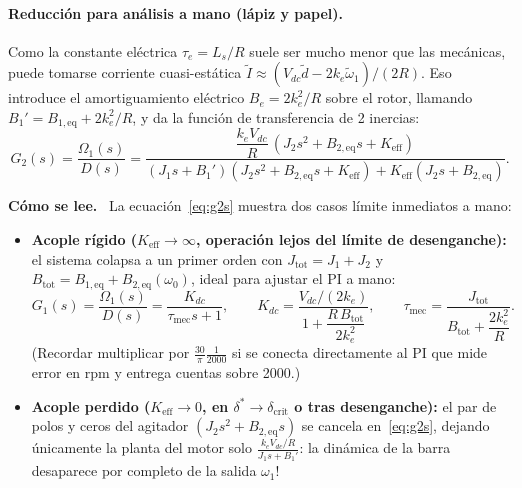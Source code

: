 \documentclass[11pt,a4paper,oneside]{report}
\theoremstyle{definition}
\theoremstyle{remark}
\newenvironment{lectura}%
  {\par\smallskip\noindent\textbf{Cómo se lee.}\ }%
  {\par\smallskip}
\begin{document}
\paragraph{Reducción para análisis a mano (lápiz y papel).} Como la constante
eléctrica $\tau_e = L_s/R$ suele ser mucho menor que las mecánicas, puede
tomarse corriente cuasi-estática $\tilde I \approx (V_{dc}\tilde d - 2k_e\tilde\omega_1)/(2R)$.
Eso introduce el amortiguamiento eléctrico $B_e = 2k_e^2/R$ sobre el rotor,
llamando $B_1' = B_{1,\text{eq}} + 2k_e^2/R$, y da la función de transferencia
de 2 inercias:
\begin{equation}
  G_2(s) = \frac{\Omega_1(s)}{D(s)}
  = \frac{\dfrac{k_e V_{dc}}{R}\,(J_2 s^2 + B_{2,\text{eq}} s + K_{\text{eff}})}
         {(J_1 s + B_1')(J_2 s^2 + B_{2,\text{eq}} s + K_{\text{eff}}) + K_{\text{eff}}(J_2 s + B_{2,\text{eq}})}.
  \label{eq:g2s}
\end{equation}
\begin{lectura}
La ecuación~\eqref{eq:g2s} muestra dos casos límite inmediatos a mano:
\begin{itemize}
  \item \textbf{Acople rígido ($K_{\text{eff}}\to\infty$, operación lejos del
        límite de desenganche):} el sistema colapsa a un primer orden con
        $J_{\text{tot}} = J_1 + J_2$ y $B_{\text{tot}} = B_{1,\text{eq}} + B_{2,\text{eq}}(\omega_0)$,
        ideal para ajustar el PI a mano:
        \begin{equation}
          G_1(s) = \frac{\Omega_1(s)}{D(s)} = \frac{K_{dc}}{\tau_{\text{mec}} s + 1},
          \qquad
          K_{dc} = \frac{V_{dc}/(2k_e)}{1 + \dfrac{R\,B_{\text{tot}}}{2k_e^2}},
          \qquad
          \tau_{\text{mec}} = \frac{J_{\text{tot}}}{B_{\text{tot}} + \dfrac{2k_e^2}{R}}.
          \label{eq:g1s}
        \end{equation}
        (Recordar multiplicar por $\frac{30}{\pi}\frac{1}{2000}$ si se conecta
        directamente al PI que mide error en rpm y entrega cuentas sobre 2000.)
  \item \textbf{Acople perdido ($K_{\text{eff}}\to 0$, en $\delta^\ast\to\delta_{\text{crit}}$ o tras desenganche):}
        el par de polos y ceros del agitador $(J_2 s^2 + B_{2,\text{eq}} s)$ se
        cancela en~\eqref{eq:g2s}, dejando únicamente la planta del motor solo
        $\frac{k_e V_{dc}/R}{J_1 s + B_1'}$: la dinámica de la barra desaparece
        por completo de la salida $\omega_1$!
\end{itemize}
\end{lectura}
\end{document}
